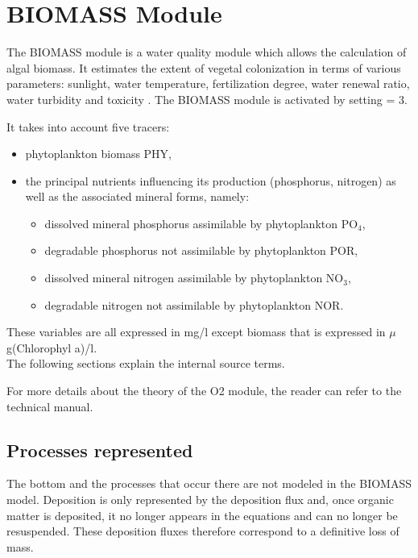 \chapter{BIOMASS Module}

The BIOMASS module is a water quality module which allows the calculation of algal biomass.
It estimates the extent of vegetal colonization in terms of various parameters:
sunlight, water temperature, fertilization degree, water renewal ratio,
water turbidity and toxicity \cite{gosse_biomass_1983}.
The BIOMASS module is activated by setting  = 3.

It takes into account five tracers:

\begin{itemize}
\item phytoplankton biomass PHY,
\item the principal nutrients influencing its production (phosphorus, nitrogen)
  as well as the associated mineral forms, namely:

\begin{itemize}
\item dissolved mineral phosphorus assimilable by phytoplankton PO$_4$,
\item degradable phosphorus not assimilable by phytoplankton POR,
\item dissolved mineral nitrogen assimilable by phytoplankton NO$_3$,
\item degradable nitrogen not assimilable by phytoplankton NOR.
\end{itemize}
\end{itemize}

These variables are all expressed in mg/l except biomass that is expressed in $\mu$g(Chlorophyl a)/l.\\

The following sections explain the internal source terms.

For more details about the theory of the O2 module,
the reader can refer to the \waqtel technical manual.


\section{Processes represented}

The bottom and the processes that occur there are not modeled in the BIOMASS model.
Deposition is only represented by the deposition flux and,
once organic matter is deposited,
it no longer appears in the equations and can no longer be resuspended.
These deposition fluxes therefore correspond to a definitive loss of mass.


